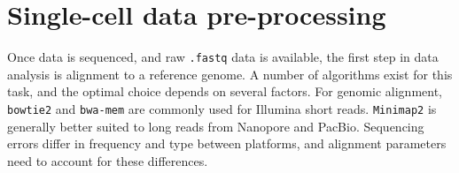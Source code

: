


\section{Single-cell data pre-processing}
\label{sect:computational}
Once data is sequenced, and raw \verb|.fastq| data is available, the first step in data analysis is alignment to a reference genome. A number of algorithms exist for this task, and the optimal choice depends on several factors. For genomic alignment, \verb|bowtie2| and \verb|bwa-mem| are commonly used for Illumina short reads. \verb|Minimap2| is generally better suited to long reads from Nanopore and PacBio. Sequencing errors differ in frequency and type between platforms, and alignment parameters need to account for these differences.

